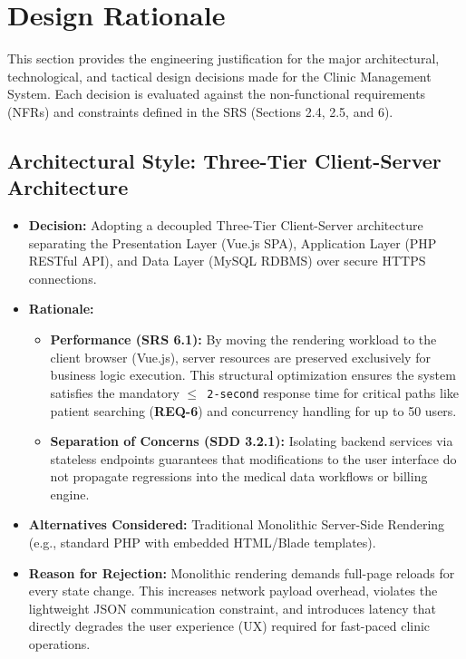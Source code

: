 
\section{Design Rationale}
\label{sec:design_rationale}

This section provides the engineering justification for the major architectural, technological, and tactical design decisions made for the Clinic Management System. Each decision is evaluated against the non-functional requirements (NFRs) and constraints defined in the SRS (Sections 2.4, 2.5, and 6).

\subsection{Architectural Style: Three-Tier Client-Server Architecture}
\label{subsec:rationale_architecture}

\begin{itemize}
	\item \textbf{Decision:} Adopting a decoupled Three-Tier Client-Server architecture separating the Presentation Layer (Vue.js SPA), Application Layer (PHP RESTful API), and Data Layer (MySQL RDBMS) over secure HTTPS connections.
	\item \textbf{Rationale:} 
	\begin{itemize}
		\item \textbf{Performance (SRS 6.1):} By moving the rendering workload to the client browser (Vue.js), server resources are preserved exclusively for business logic execution. This structural optimization ensures the system satisfies the mandatory \texttt{$\le$ 2-second} response time for critical paths like patient searching (\textbf{REQ-6}) and concurrency handling for up to 50 users.
		\item \textbf{Separation of Concerns (SDD 3.2.1):} Isolating backend services via stateless endpoints guarantees that modifications to the user interface do not propagate regressions into the medical data workflows or billing engine.
	\end{itemize}
	\item \textbf{Alternatives Considered:} Traditional Monolithic Server-Side Rendering (e.g., standard PHP with embedded HTML/Blade templates).
	\item \textbf{Reason for Rejection:} Monolithic rendering demands full-page reloads for every state change. This increases network payload overhead, violates the lightweight JSON communication constraint, and introduces latency that directly degrades the user experience (UX) required for fast-paced clinic operations.
\end{itemize}


